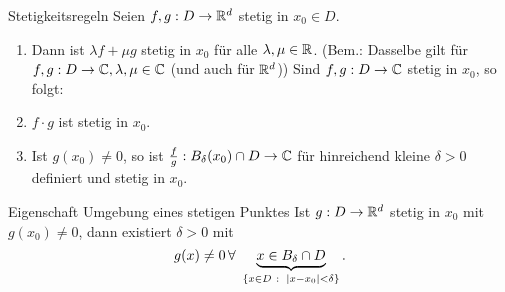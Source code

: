 \documentclass[main.tex]{subfiles}
\begin{document}
\begin{karte}{Stetigkeitsregeln}
    Seien \( f,g : D \rightarrow \mathbb{R}^d \) 
    stetig in \( x_0 \in D \).
    \begin{enumerate}
        \item Dann ist \( \lambda f + \mu g \) 
        stetig in \( x_0 \) für alle 
        \( \lambda, \mu \in \mathbb{R} \).
        (Bem.: Dasselbe gilt für \( f,g:D\rightarrow \mathbb{C}, 
        \lambda, \mu \in \mathbb{C} \) (und auch für \( \mathbb{R}^d \)))
        Sind \( f,g: D\rightarrow \mathbb{C} \) stetig 
        in \( x_0 \), so folgt:
        \item \( f \cdot g \) ist stetig in \( x_0 \).
        \item Ist \( g(x_0) \neq 0 \), so ist \( \frac{f}{g} : 
        B_\delta(x_0) \cap D \rightarrow \mathbb{C} \) 
        für hinreichend kleine \( \delta > 0 \) 
        definiert und stetig in \( x_0 \).
    \end{enumerate}
\end{karte}
\begin{karte}{Eigenschaft Umgebung eines stetigen Punktes} %
    Ist \( g: D\rightarrow \mathbb{R}^d \) stetig in \( x_0 \) mit 
    \( g(x_0) \neq 0 \), dann existiert \( \delta > 0 \) mit 
    \[ g(x) \neq 0 \,\forall \, \underbrace{x\in B_\delta \cap D
    }_{ \set{x\in D \;\colon \; \abs{x-x_0} < \delta } }. \]
\end{karte}
\end{document}
